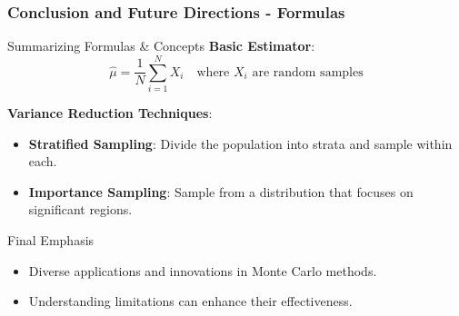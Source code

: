 \documentclass[aspectratio=169]{beamer}
\begin{document}
\begin{frame}[fragile]
    \frametitle{Conclusion and Future Directions - Formulas}
    \begin{block}{Summarizing Formulas & Concepts}
        \textbf{Basic Estimator}:
        \begin{equation}
            \hat{\mu} = \frac{1}{N} \sum_{i=1}^{N} X_i \quad \text{where } X_i \text{ are random samples}
        \end{equation}

        \textbf{Variance Reduction Techniques}:
        \begin{itemize}
            \item \textbf{Stratified Sampling}: Divide the population into strata and sample within each.
            \item \textbf{Importance Sampling}: Sample from a distribution that focuses on significant regions.
        \end{itemize}
    \end{block}
    
    \begin{block}{Final Emphasis}
        \begin{itemize}
            \item Diverse applications and innovations in Monte Carlo methods.
            \item Understanding limitations can enhance their effectiveness.
        \end{itemize}
    \end{block}
\end{frame}
\end{document}
